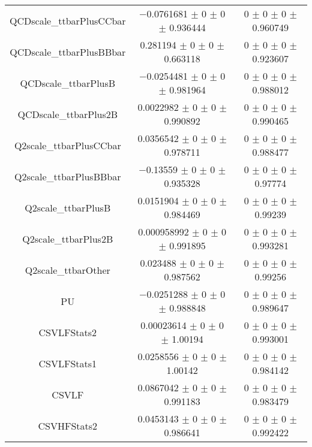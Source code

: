 \begin{table}
\begin{tabular}{ccc}
QCDscale\_ttbarPlusCCbar 	& \num{-0.0761681} $\pm$ \num{0} $\pm$ \num{0} $\pm$ \num{0.936444} 	& \num{0} $\pm$ \num{0} $\pm$ \num{0} $\pm$ \num{0.960749}\\
QCDscale\_ttbarPlusBBbar 	& \num{0.281194} $\pm$ \num{0} $\pm$ \num{0} $\pm$ \num{0.663118} 	& \num{0} $\pm$ \num{0} $\pm$ \num{0} $\pm$ \num{0.923607}\\
QCDscale\_ttbarPlusB 	& \num{-0.0254481} $\pm$ \num{0} $\pm$ \num{0} $\pm$ \num{0.981964} 	& \num{0} $\pm$ \num{0} $\pm$ \num{0} $\pm$ \num{0.988012}\\
QCDscale\_ttbarPlus2B 	& \num{0.0022982} $\pm$ \num{0} $\pm$ \num{0} $\pm$ \num{0.990892} 	& \num{0} $\pm$ \num{0} $\pm$ \num{0} $\pm$ \num{0.990465}\\
Q2scale\_ttbarPlusCCbar 	& \num{0.0356542} $\pm$ \num{0} $\pm$ \num{0} $\pm$ \num{0.978711} 	& \num{0} $\pm$ \num{0} $\pm$ \num{0} $\pm$ \num{0.988477}\\
Q2scale\_ttbarPlusBBbar 	& \num{-0.13559} $\pm$ \num{0} $\pm$ \num{0} $\pm$ \num{0.935328} 	& \num{0} $\pm$ \num{0} $\pm$ \num{0} $\pm$ \num{0.97774}\\
Q2scale\_ttbarPlusB 	& \num{0.0151904} $\pm$ \num{0} $\pm$ \num{0} $\pm$ \num{0.984469} 	& \num{0} $\pm$ \num{0} $\pm$ \num{0} $\pm$ \num{0.99239}\\
Q2scale\_ttbarPlus2B 	& \num{0.000958992} $\pm$ \num{0} $\pm$ \num{0} $\pm$ \num{0.991895} 	& \num{0} $\pm$ \num{0} $\pm$ \num{0} $\pm$ \num{0.993281}\\
Q2scale\_ttbarOther 	& \num{0.023488} $\pm$ \num{0} $\pm$ \num{0} $\pm$ \num{0.987562} 	& \num{0} $\pm$ \num{0} $\pm$ \num{0} $\pm$ \num{0.99256}\\
PU 	& \num{-0.0251288} $\pm$ \num{0} $\pm$ \num{0} $\pm$ \num{0.988848} 	& \num{0} $\pm$ \num{0} $\pm$ \num{0} $\pm$ \num{0.989647}\\
CSVLFStats2 	& \num{0.00023614} $\pm$ \num{0} $\pm$ \num{0} $\pm$ \num{1.00194} 	& \num{0} $\pm$ \num{0} $\pm$ \num{0} $\pm$ \num{0.993001}\\
CSVLFStats1 	& \num{0.0258556} $\pm$ \num{0} $\pm$ \num{0} $\pm$ \num{1.00142} 	& \num{0} $\pm$ \num{0} $\pm$ \num{0} $\pm$ \num{0.984142}\\
CSVLF 	& \num{0.0867042} $\pm$ \num{0} $\pm$ \num{0} $\pm$ \num{0.991183} 	& \num{0} $\pm$ \num{0} $\pm$ \num{0} $\pm$ \num{0.983479}\\
CSVHFStats2 	& \num{0.0453143} $\pm$ \num{0} $\pm$ \num{0} $\pm$ \num{0.986641} 	& \num{0} $\pm$ \num{0} $\pm$ \num{0} $\pm$ \num{0.992422}\\

\end{tabular}
\end{table}
